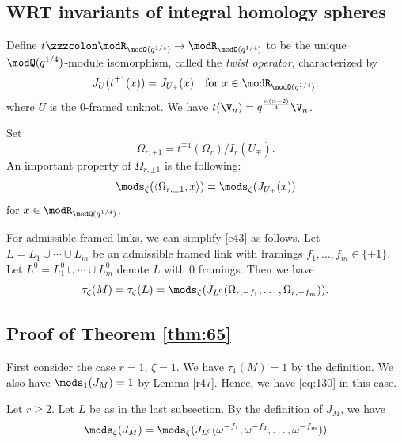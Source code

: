 \documentclass{amsart}
\numberwithin{equation}{section}
\numberwithin{figure}{section}
\theoremstyle{plain}
\theoremstyle{definition}
\theoremstyle{remark}
\begin{document}
\subsection{WRT invariants of integral homology spheres}
\label{sec:wrt-invar-integr}

Define $t\zzzcolon \modR _{\modQ (q^{1/4})}\rightarrow \modR _{\modQ (q^{1/4})}$ to be the unique
$\modQ (q^{1/4})$-module isomorphism, called the {\em twist operator},
characterized by
\begin{equation*}
  J_U(t^{\pm 1}(x))= J_{U_\pm }(x)\quad \text{for $x\in \modR _{\modQ (q^{1/4})}$},
\end{equation*}
where $U$ is the $0$-framed unknot.  We have
$t(\V_n)=q^{\frac{n(n+2)}{4}}\V_n$.

Set
\begin{equation*}
  \Omega _{r,\pm 1} = t^{\mp1}(\Omega _r)/I_r(U_\mp).
\end{equation*}
An important property of $\Omega _{r,\pm 1}$ is the following:
\begin{equation}
  \label{e46}
  \mods _\zeta (\langle \Omega _{r,\pm 1},x\rangle ) = \mods _\zeta (J_{U_\pm }(x))
\end{equation}
for $x\in \modR _{\modQ (q^{1/4})}$.

For admissible framed links, we can simplify \eqref{e43} as follows.
Let $L=L_1\cup \cdots\cup L_m$ be an admissible framed link with framings
$f_1,\ldots,f_m\in \{\pm 1\}$.  Let $L^0=L^0_1\cup \cdots\cup L^0_m$ denote $L$ with $0$
framings.  Then we have
\begin{equation*}
  \tau _\zeta (M)=\tau _\zeta (L)=\mods _\zeta (J_{L^0}(\Omega _{r,-f_1},\ldots,\Omega _{r,-f_m})).
\end{equation*}

\subsection{Proof of Theorem \ref{thm:65}}
\label{sec:proof-theor-refth}

First consider the case $r=1$, $\zeta =1$.  We have $\tau _1(M)=1$ by the
definition.  We also have $\mods _1(J_M)=1$ by Lemma \ref{r47}.
Hence, we have \eqref{eq:130} in this case.

Let $r\ge 2$.  Let $L$ be as in the last subsection.  By the definition
of $J_M$, we have
\begin{equation}
  \label{e49}
  \mods _\zeta (J_M)= \mods _\zeta (J_{L^0}(\omega ^{-f_1},\omega ^{-f_2},\ldots,\omega ^{-f_m}))
\end{equation}
\end{document}
